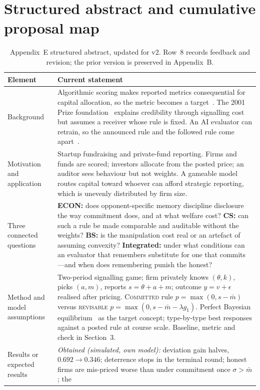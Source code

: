 \section{Structured abstract and cumulative proposal map}
\begin{table}[t]
\small
\caption{Appendix~E structured abstract, updated for v2. Row~8 records feedback
and revision; the prior version is preserved in Appendix~B.}
\begin{tabularx}{\textwidth}{@{}p{26mm}Y@{}}
\toprule
\textbf{Element} & \textbf{Current statement} \\
\midrule
Background & Algorithmic scoring makes reported metrics consequential for
capital allocation, so the metric becomes a target~\cite{strathern1997,
perdomo2020}. The 2001 Prize foundation~\cite{nobel2001,spence1973} explains
credibility through signalling cost but assumes a receiver whose rule is fixed.
An AI evaluator can retrain, so the announced rule and the followed rule come
apart~\cite{banchio2025}. \\
Motivation and application & Startup fundraising and private-fund reporting.
Firms and funds are scored; investors allocate from the posted price; an auditor
sees behaviour but not weights. A gameable model routes capital toward whoever
can afford strategic reporting, which is unevenly distributed by firm size. \\
Three connected questions & \textbf{ECON:} does opponent-specific memory
discipline disclosure the way commitment does, and at what welfare cost?
\textbf{CS:} can such a rule be made comparable and auditable without the
weights? \textbf{BS:} is the manipulation cost real or an artefact of assuming
convexity? \textbf{Integrated:} under what conditions can an evaluator that
remembers substitute for one that commits---and when does remembering punish the
honest? \\
Method and model assumptions & Two-period signalling game; firm privately knows
$(\theta,k)$, picks $(a,m)$, reports $s=\theta+a+m$; outcome $y=v+\epsilon$
realised after pricing. \textsc{Committed} rule $p=\max(0,s-\bar m)$ versus
\textsc{revisable} $p=\max(0,s-\bar m-\lambda g_1)$. Perfect Bayesian
equilibrium~\cite{harsanyi1968} as the target concept; type-by-type best
responses against a posted rule at course scale. Baseline, metric and check in
Section~3. \\
Results or expected results & \emph{Obtained (simulated, own model):} deviation
gain halves, $0.692\to0.346$; deterrence stops in the terminal round; honest
firms are mis-priced worse than under commitment once $\sigma>\bar m$; the

\end{tabularx}
\end{table}
